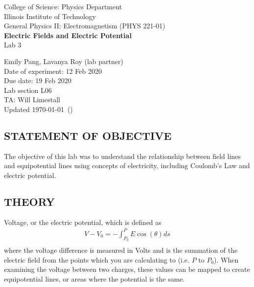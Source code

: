 \documentclass [12pt, letterpaper, twoside] {article}
\begin{document}
\begin {titlepage}
\begin {center}
College of Science: Physics Department \\
\vspace {0.1cm}
Illinois Institute of Technology\\
\vspace {0.1cm}
General Physics II: Electromagnetism (PHYS 221-01)\\
\vspace* {\fill}
\begingroup
\Large
\textbf {Electric Fields and Electric Potential} \\
\vspace {0.35cm}
\normalsize
Lab 3
\vspace {1.5cm}
\endgroup
\vspace* {\fill}
\end {center}

\vspace*{\fill}
\begin {flushright}
\footnotesize
Emily Pang, Lavanya Roy (lab partner) \\
Date of experiment: 12 Feb 2020 \\
Due date: 19 Feb 2020 \\
Lab section L06 \\
TA: Will Limestall \\
Updated \usdate\today~(\currenttime)
\end {flushright}
\end {titlepage}
\subsection* {STATEMENT OF OBJECTIVE}
The objective of this lab was to understand the relationship between field lines and equipotential lines using concepts of electricity, including Coulomb's Law and electric potential.

\subsection* {THEORY}
Voltage, or the electric potential, which is defined as
\begin{equation}
  \begin{split}
    V - V_{0} = -\int_{P_{0}}^{P}E\cos(\theta)ds \\
  \end{split}
\end{equation}
where the voltage difference is measured in Volts and is the summation of the electric field from the points which you are calculating to (i.e. \(P\) to \(P_{0}\)).\cite{labManual} When examining the voltage between two charges, these values can be mapped to create equipotential lines, or areas where the potential is the same. 
\end{document}

